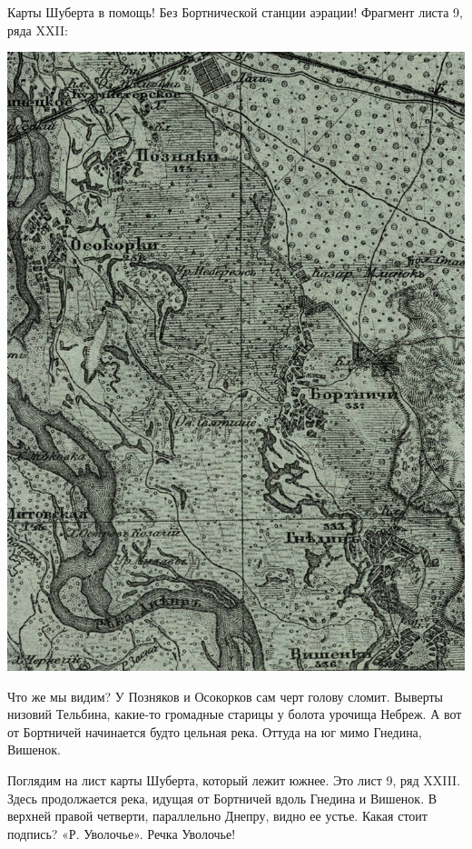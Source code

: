 Карты Шуберта в помощь! Без Бортнической станции аэрации! Фрагмент листа 9, ряда XXII:
\vspace*{\fill}
\begin{center}
\includegraphics[width=\linewidth]{chast-gorodki/terbin/s_volocha-01.jpg}
\end{center}
\vspace*{\fill}
\newpage

Что же мы видим? У Позняков и Осокорков сам черт голову сломит. Выверты низовий Тельбина, какие-то громадные старицы у болота урочища Небреж. А вот от Бортничей начинается будто цельная река. Оттуда на юг мимо Гнедина, Вишенок.

Поглядим на лист карты Шуберта, который лежит южнее. Это лист 9, ряд XXIII. Здесь продолжается река, идущая от Бортничей вдоль Гнедина и Вишенок. В верхней правой четверти, параллельно Днепру, видно ее устье. Какая стоит подпись? «Р. Уволочье». Речка Уволочье!

